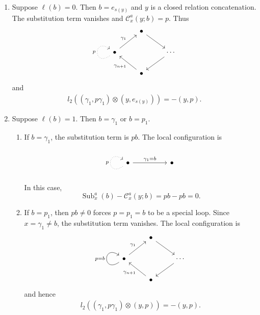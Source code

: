 \documentclass[11pt,a4paper,reqno]{amsart}
\newcommand{\mC}{\mathcal C}
\newcommand{\Sub}{\operatorname{Sub}}
\newcommand{\para}[2]{(#1,#2)}
\theoremstyle{plain}
\theoremstyle{definition}
\numberwithin{equation}{section}
\begin{document}
	\begin{enumerate}
		\item Suppose $\ell(b)=0$.  Then $b=e_{s(y)}$ and $y$ is a closed relation
		concatenation.  The substitution term vanishes and
		$\mC_x^a(y;b)=p$.  Thus
		\[
		\begin{tikzcd}
			& \bullet & \\
			\bullet && \cdots \\
			& \bullet
			\arrow[from=1-2, to=2-3]
			\arrow["{\gamma_1}", from=2-1, to=1-2]
			\arrow["{p}",dotted, from=2-1, to=2-1, loop, in=145, out=215, distance=10mm]
			\arrow[from=2-3, to=3-2]
			\arrow["{\gamma_{n+1}}", from=3-2, to=2-1]
		\end{tikzcd}
		\]
		and
		\begin{align}
			l_2(\para{\gamma_1}{p\gamma_1}\otimes\para{y}{e_{s(y)}})
			=-\para{y}{p}.
			\label{eq:mixed-local-first}
		\end{align}
		
		\item Suppose $\ell(b)=1$.  Then $b=\gamma_1$ or $b=p_1$.
		\begin{enumerate}
			\item If $b=\gamma_1$, the substitution term is $pb$.  The local
			configuration is
			\[
			\begin{tikzcd}
				\bullet && \bullet
				\arrow["p", dotted, from=1-1, to=1-1, loop, in=145, out=215, distance=10mm]
				\arrow["{\gamma_1=b}", from=1-1, to=1-3]
			\end{tikzcd}
			\]
			In this case,
			\[
			\Sub_x^a(b)-\mC_x^a(y;b)=pb-pb=0.
			\]
			
			\item If $b=p_1$, then $pb\neq0$ forces $p=p_1=b$ to be a special
			loop.  Since $x=\gamma_1\neq b$, the substitution term vanishes.  The
			local configuration is
			\[
			\begin{tikzcd}
				& \bullet & \\
				\bullet && \cdots \\
				& \bullet
				\arrow[from=1-2, to=2-3]
				\arrow["{\gamma_1}", from=2-1, to=1-2]
				\arrow["{p=b}", from=2-1, to=2-1, loop, in=145, out=215, distance=10mm]
				\arrow[from=2-3, to=3-2]
				\arrow["{\gamma_{n+1}}", from=3-2, to=2-1]
			\end{tikzcd}
			\]
			and hence
			\begin{align}
				l_2(\para{\gamma_1}{p\gamma_1}\otimes\para{y}{p})
				=-\para{y}{p}.
			\end{align}
		\end{enumerate}
		

\end{enumerate}
\end{document}
